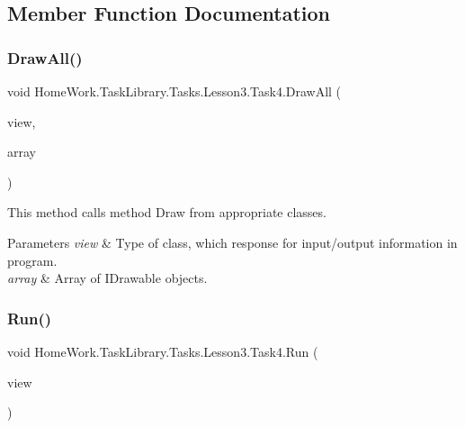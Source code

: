 \subsection{Member Function Documentation}
\mbox{\label{class_home_work_1_1_task_library_1_1_tasks_1_1_lesson3_1_1_task4_aafe53ff085465a81041b897adb29023d}} 
\subsubsection{\texorpdfstring{DrawAll()}{DrawAll()}}
{\footnotesize\ttfamily void Home\+Work.\+Task\+Library.\+Tasks.\+Lesson3.\+Task4.\+Draw\+All (\begin{DoxyParamCaption}\item[{I\+Information}]{view,  }\item[{params \mbox{\hyperlink{interface_home_work_1_1_task_library_1_1_tasks_1_1_lesson3_1_1_interfaces_1_1_i_drawable}{I\+Drawable}} \mbox{[}$\,$\mbox{]}}]{array }\end{DoxyParamCaption})\hspace{0.3cm}{\ttfamily [private]}}



This method calls method Draw from appropriate classes. 


\begin{DoxyParams}{Parameters}
{\em view} & Type of class, which response for input/output information in program.\\
\hline
{\em array} & Array of I\+Drawable objects.\\
\hline
\end{DoxyParams}
\mbox{\label{class_home_work_1_1_task_library_1_1_tasks_1_1_lesson3_1_1_task4_aa77d09aeff9779960bd6a6cd8a0c02a8}} 
\subsubsection{\texorpdfstring{Run()}{Run()}}
{\footnotesize\ttfamily void Home\+Work.\+Task\+Library.\+Tasks.\+Lesson3.\+Task4.\+Run (\begin{DoxyParamCaption}\item[{I\+Information}]{view }\end{DoxyParamCaption})}



